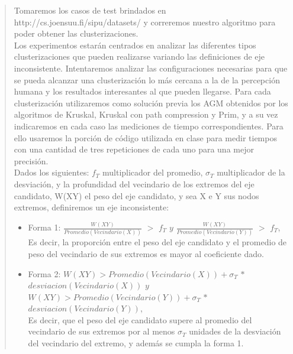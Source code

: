 \documentclass[11pt,a4paper]{article}
\begin{document}
\begin{verse}
Tomaremos los casos de test brindados en http://cs.joensuu.fi/sipu/datasets/ y correremos nuestro algoritmo para poder obtener las clusterizaciones.\\
Los experimentos estarán centrados en analizar las diferentes tipos clusterizaciones que pueden realizarse variando las definiciones de eje inconsistente. Intentaremos analizar las configuraciones necesarias para que se pueda alcanzar una clusterización lo más cercana a la de la percepción humana y los resultados interesantes al que pueden llegarse. Para cada clusterización utilizaremos como solución previa los AGM obtenidos por los algoritmos de Kruskal, Kruskal con path compression y Prim, y a su vez indicaremos en cada caso las mediciones de tiempo correspondientes.  Para ello usaremos la porción de código utilizada en clase para medir tiempos con una cantidad de tres repeticiones de cada uno para una mejor precisión.\\

Dados los siguientes: $f_{T}$ multiplicador del promedio, $\sigma_{T}$ multiplicador de la desviación, y la profundidad del vecindario de los extremos del eje candidato, W(XY) el peso del eje candidato, y sea X e Y sus nodos extremos, definiremos un eje inconsistente:
\begin{itemize}
\item Forma 1: $\frac{W(XY)}{Promedio(Vecindario(X))}$ $>$ $f_{T}$ $  y $ $\frac{W(XY)}{Promedio(Vecindario(Y))}$ $>$ $f_{T}$, \\Es decir, la proporción entre el peso del eje candidato y el promedio de peso del vecindario de sus extremos es mayor al coeficiente dado.
\item Forma 2: $W(XY) >  Promedio(Vecindario(X)) + \sigma_{T}$ $ * $ $ desviacion(Vecindario(X)) $ $ y$ $W(XY) >  Promedio(Vecindario(Y)) + \sigma_{T}$ $ * $ $ desviacion(Vecindario(Y)) $, \\Es decir, que el peso del eje candidato supere al promedio del vecindario de sus extremos por al menos $\sigma_{T}$ unidades de la desviación del vecindario del extremo, y además se cumpla la forma 1.
\end{itemize}




\end{verse}
\end{document}
